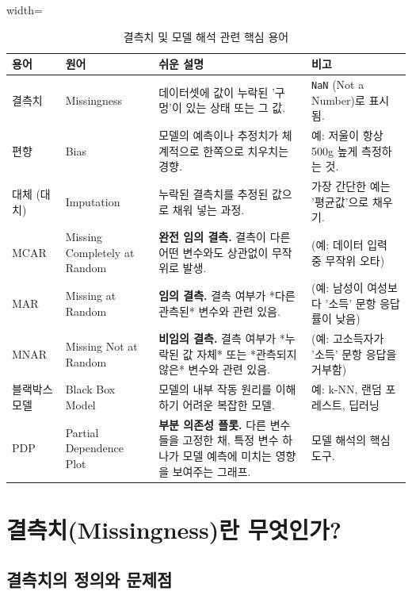 \documentclass[11pt,a4paper]{book}
\theoremstyle{definition}
\begin{document}
\begin{table}[h!]
    \centering
    \begin{adjustbox}{width=\textwidth}
        \begin{tabular}{@{}llp{6cm}l@{}}
            \toprule
            용어 & 원어 & 쉬운 설명 & 비고 \\
            \midrule
            결측치 & Missingness & 데이터셋에 값이 누락된 '구멍'이 있는 상태 또는 그 값. & \texttt{NaN} (Not a Number)로 표시됨. \\
            편향 & Bias & 모델의 예측이나 추정치가 체계적으로 한쪽으로 치우치는 경향. & 예: 저울이 항상 500g 높게 측정하는 것. \\
            대체 (대치) & Imputation & 누락된 결측치를 추정된 값으로 채워 넣는 과정. & 가장 간단한 예는 '평균값'으로 채우기. \\
            \midrule
            MCAR & Missing Completely at Random & \textbf{완전 임의 결측.} 결측이 다른 어떤 변수와도 상관없이 무작위로 발생. & (예: 데이터 입력 중 무작위 오타) \\
            MAR & Missing at Random & \textbf{임의 결측.} 결측 여부가 *다른 관측된* 변수와 관련 있음. & (예: 남성이 여성보다 '소득' 문항 응답률이 낮음) \\
            MNAR & Missing Not at Random & \textbf{비임의 결측.} 결측 여부가 *누락된 값 자체* 또는 *관측되지 않은* 변수와 관련 있음. & (예: 고소득자가 '소득' 문항 응답을 거부함) \\
            \midrule
            블랙박스 모델 & Black Box Model & 모델의 내부 작동 원리를 이해하기 어려운 복잡한 모델. & 예: k-NN, 랜덤 포레스트, 딥러닝 \\
            PDP & Partial Dependence Plot & \textbf{부분 의존성 플롯.} 다른 변수들을 고정한 채, 특정 변수 하나가 모델 예측에 미치는 영향을 보여주는 그래프. & 모델 해석의 핵심 도구. \\
            \bottomrule
        \end{tabular}
    \end{adjustbox}
    \caption{결측치 및 모델 해석 관련 핵심 용어}
    \label{tab:terms}
\end{table}


\section{결측치(Missingness)란 무엇인가?}

\subsection{결측치의 정의와 문제점}
\end{document}
